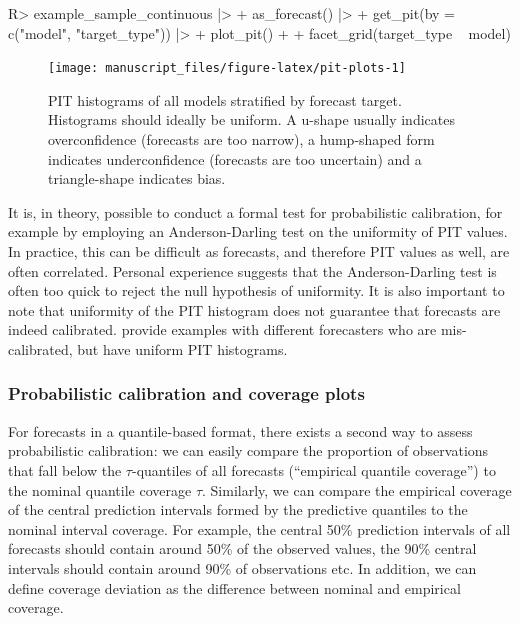 \documentclass[
]{jss}
\begin{document}
\begin{CodeChunk}
\begin{CodeInput}
R> example_sample_continuous |>
+   as_forecast() |>
+   get_pit(by = c("model", "target_type")) |>
+   plot_pit() + 
+   facet_grid(target_type ~ model)
\end{CodeInput}
\begin{figure}[!h]

{\centering \texttt{[image: manuscript\_files/figure-latex/pit-plots-1]} 

}

\caption[PIT histograms of all models stratified by forecast target]{PIT histograms of all models stratified by forecast target. Histograms should ideally be uniform. A u-shape usually indicates overconfidence (forecasts are too narrow), a hump-shaped form indicates underconfidence (forecasts are too uncertain) and a triangle-shape indicates bias.}\label{fig:pit-plots}
\end{figure}
\end{CodeChunk}

It is, in theory, possible to conduct a formal test for probabilistic
calibration, for example by employing an Anderson-Darling test on the
uniformity of PIT values. In practice, this can be difficult as
forecasts, and therefore PIT values as well, are often correlated.
Personal experience suggests that the Anderson-Darling test is often too
quick to reject the null hypothesis of uniformity. It is also important
to note that uniformity of the PIT histogram does not guarantee that
forecasts are indeed calibrated.
\cite{gneitingProbabilisticForecastsCalibration2007, hamillInterpretationRankHistograms2001a}
provide examples with different forecasters who are mis-calibrated, but
have uniform PIT histograms.

\subsubsection{Probabilistic calibration and coverage
plots}\label{probabilistic-calibration-and-coverage-plots}

For forecasts in a quantile-based format, there exists a second way to
assess probabilistic calibration: we can easily compare the proportion
of observations that fall below the \(\tau\)-quantiles of all forecasts
(``empirical quantile coverage'') to the nominal quantile coverage
\(\tau\). Similarly, we can compare the empirical coverage of the
central prediction intervals formed by the predictive quantiles to the
nominal interval coverage. For example, the central 50\% prediction
intervals of all forecasts should contain around 50\% of the observed
values, the 90\% central intervals should contain around 90\% of
observations etc. In addition, we can define coverage deviation as the
difference between nominal and empirical coverage.
\end{document}
